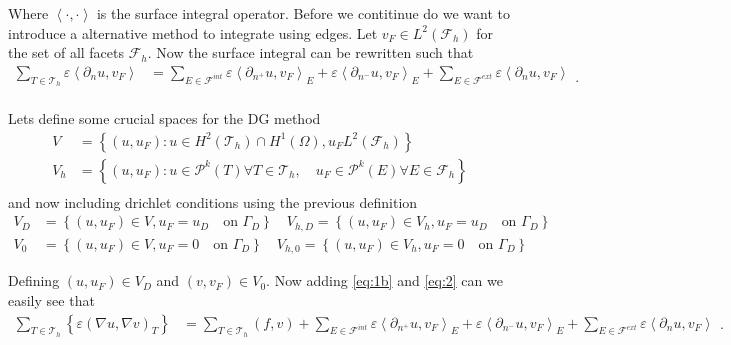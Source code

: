 Where $\left< \cdot ,\cdot  \right>$ is the surface integral operator. Before we contitinue do we want to introduce a
alternative method to integrate using edges. Let $v_{F} \in  L^2\left( \mathcal{F}_{h}  \right)$ for the set of all
facets $\mathcal{F} _{h}$. Now the surface integral can be rewritten such that
\begin{equation}
\label{eq:2}
    \begin{split}
 \sum_{T \in
\mathcal{T} _{h}}^{} \varepsilon  \left<\partial _{n} u , v_{F} \right>
&= \sum_{E \in \mathcal{F} ^{int}}^{}  \varepsilon \left<\partial _{n^{+}} u, v_{F} \right>_{E} + \varepsilon \left<
\partial _{n^{-}} u, v_{F}
\right>_{E} + \sum_{E \in \mathcal{F} ^{ext}}^{} \varepsilon \left<\partial _{n} u, v_{F} \right>   \\
    \end{split}
.\end{equation}

Lets define some crucial spaces for the DG method \[
    \begin{split}
V &=  \left\{ \left( u, u_{F} \right) : u \in H^2\left( \mathcal{T} _{h} \right) \cap H^{1}\left( \Omega  \right)   ,
u_{F} L^2\left( \mathcal{F} _{h} \right)  \right\} \\
V_{h} &=  \left\{ \left( u,u_{F} \right) : u \in  \mathcal{P} ^{k} \left( T \right) \forall T \in  \mathcal{T} _{h} , \quad
u_{F} \in  \mathcal{P} ^{k}\left( E \right)  \forall E  \in \mathcal{F} _{h}   \right\} \\
    \end{split}
\]
and now including drichlet conditions using the previous definition \[
\begin{split}
    V_{D} & = \left\{ \left( u,u_{F} \right) \in V , u_{F} = u_{D} \quad  \text{on } \Gamma _{D}  \right\} \quad
    V_{h,D}  = \left\{ \left( u, u_{F} \right) \in  V_{h}, u_{F} = u_{D} \quad  \text{on } \Gamma _{D}  \right\} \\
    V_{0} & = \left\{ \left( u,u_{F} \right) \in V , u_{F} = 0 \quad  \text{on } \Gamma _{D}  \right\} \quad
    V_{h,0}  = \left\{ \left( u, u_{F} \right) \in  V_{h}, u_{F} = 0 \quad  \text{on } \Gamma _{D}  \right\}
\end{split}
\]

Defining  $\left( u, u_{F} \right) \in  V_{D} $ and $\left( v, v_{F} \right) \in  V_{0} $.
Now adding \eqref{eq:1b} and \eqref{eq:2} can we easily see that
\begin{equation}
    \label{eq:3a}
    \begin{split}
   \sum_{T \in \mathcal{T} _{h}}^{}
     \left\{ \varepsilon\left( \nabla u, \nabla v \right) _{T}  \right\}
     & = \sum_{T \in \mathcal{T} _{h}}^{}  \left( f,v \right) +\sum_{E \in \mathcal{F} ^{int}}^{}  \varepsilon \left<\partial _{n^{+}} u, v_{F} \right>_{E} + \varepsilon \left<
\partial _{n^{-}} u, v_{F} \right>_{E} + \sum_{E \in \mathcal{F} ^{ext}}^{} \varepsilon \left<\partial _{n} u, v_{F} \right>
    \end{split}
.\end{equation}

